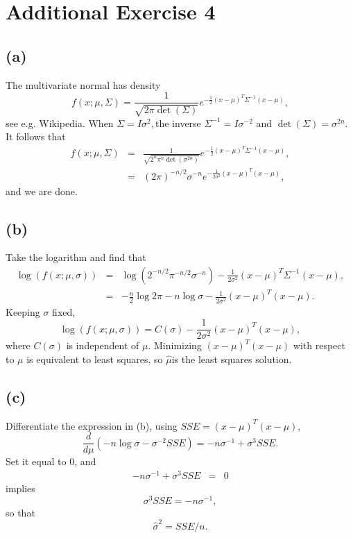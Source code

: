 \section*{Additional Exercise 4}

\subsection*{(a)}

The multivariate normal has density
\[
f(x;\mu,\Sigma)=\frac{1}{\sqrt{2\pi\det(\Sigma)}}e^{-\frac{1}{2}(x-\mu)^{T}\Sigma^{-1}(x-\mu)},
\]
see e.g. Wikipedia. When $\Sigma=I\sigma^{2},$the inverse $\Sigma^{-1}=I\sigma^{-2}$
and $\det(\Sigma)=\sigma^{2n}$. It follows that
\begin{eqnarray*}
f(x;\mu,\Sigma) & = & \frac{1}{\sqrt{2^{n}\pi^{n}\det(\sigma^{2n})}}e^{-\frac{1}{2}(x-\mu)^{T}\Sigma^{-1}(x-\mu)},\\
 & = & (2\pi)^{-n/2}\sigma^{-n}e^{-\frac{1}{2\sigma^{2}}(x-\mu)^{T}(x-\mu)},
\end{eqnarray*}
and we are done.

\subsection*{(b)}
Take the logarithm and find that
\begin{eqnarray*}
\log(f(x;\mu,\sigma)) & = & \log(2^{-n/2}\pi^{-n/2}\sigma^{-n})-\frac{1}{2\sigma^{2}}(x-\mu)^{T}\Sigma^{-1}(x-\mu),\\
 & = & -\frac{n}{2}\log2\pi-n\log\sigma-\frac{1}{2\sigma^{2}}(x-\mu)^{T}(x-\mu).
\end{eqnarray*}
Keeping $\sigma$ fixed, 
\[
\log(f(x;\mu,\sigma))=C(\sigma)-\frac{1}{2\sigma^{2}}(x-\mu)^{T}(x-\mu),
\]
where $C(\sigma)$ is independent of $\mu$. Minimizing $(x-\mu)^{T}(x-\mu)$
with respect to $\mu$ is equivalent to least squares, so $\hat{\mu}$is
the least squares solution.

\subsection*{(c)}
Differentiate the expression in (b), using $SSE=(x-\mu)^{T}(x-\mu)$,
\[
\frac{d}{d\mu}(-n\log\sigma-\sigma^{-2}SSE)=-n\sigma^{-1}+\sigma^{3}SSE.
\]
Set it equal to $0$, and
\begin{eqnarray*}
-n\sigma^{-1}+\sigma^{3}SSE & = & 0
\end{eqnarray*}
implies
\[
\sigma^{3}SSE=-n\sigma^{-1},
\]
so that
\[
\hat{\sigma}^{2}=SSE/n.
\]


